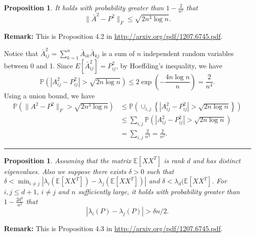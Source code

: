 \documentclass[a4paper]{article}
\newenvironment{proof}{{\bf Proof:  }}{\hfill\rule{2mm}{2mm}}
\newtheorem{proposition}[fact]{Proposition}
\begin{document}
\begin{proposition}
\label{prop:AbarSquareDiff}
It holds with probability greater than $1 - \frac{2}{n^2}$ that
\[
      \| \bar{A}^2 - P^2 \|_F \le \sqrt{2 n^3 \log n}.
\]
\end{proposition}
\textbf{Remark:} This is Proposition 4.2 in \href{url}{http://arxiv.org/pdf/1207.6745.pdf}.

\noindent
\begin{proof}
Notice that $\bar{A}_{ij}^2 = \sum_{k=1}^n \bar{A}_{ik} \bar{A}_{kj}$ is a sum of $n$ independent random variables between 0 and 1. Since $E[\bar{A}_{ij}^2] = P_{ij}^2$, by Hoeffding's inequality, we have
\[
	\mathbb{P}\left( |A_{ij}^2 - P_{ij}^2| > \sqrt{2 n \log n} \right)
    \le 2 \exp \left( - \frac{4 n \log n}{n} \right)
    = \frac{2}{n^4}.
\]
Using a union bound, we have
\begin{align*}
	\mathbb{P} \left( \|A^2 - P^2\|_F > \sqrt{2 n^3 \log n} \right)
    & \le \mathbb{P} \left( \cup_{i,j} \left\{ |A_{ij}^2 - P_{ij}^2| > \sqrt{2 n \log n} \right\} \right) \\
    & \le \sum_{i,j} \mathbb{P} \left( |A_{ij}^2 - P_{ij}^2| > \sqrt{2 n \log n} \right) \\
    & = \sum_{i,j} \frac{2}{n^4}
    = \frac{2}{n^2}.
\end{align*}
\end{proof}








\begin{proposition}
\label{prop:eigengap}
Assuming that the matrix $\mathbb{E}[X X^T]$ is rank $d$ and has distinct eigenvalues. Also we suppose there exists $\delta > 0$ such that $\delta < \min_{i \ne j} |\lambda_i(\mathbb{E}[X X^T]) - \lambda_j(\mathbb{E}[X X^T])|$ and $\delta < \lambda_d(\mathbb{E}[X X^T]$. For $i, j \le d+1$, $i \ne j$ and $n$ sufficiently large, it holds with probability greater than $1 - \frac{2d^2}{n^2}$ that
\[
	|\lambda_i(P) - \lambda_j(P)| > \delta n / 2.
\]
\end{proposition}
\textbf{Remark:} This is Proposition 4.3 in \href{url}{http://arxiv.org/pdf/1207.6745.pdf}.
\end{document}
